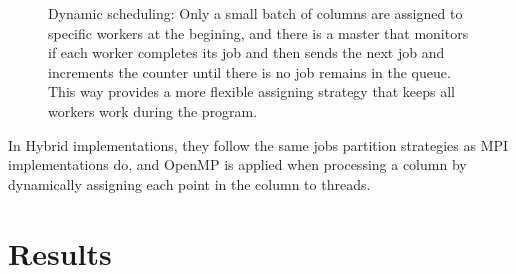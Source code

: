 \documentclass[12pt]{article}
\makeatletter
\renewenvironment{itemize}
{\list{$\bullet$}{\leftmargin\z@ \labelwidth\z@ \itemindent-\leftmargin
\let\makelabel\descriptionlabel}}
{\endlist}
\makeatother
\begin{document}
\begin{itemize}
\begin{figure}
        \hspace{-.5cm}
        \vspace{-.5cm}
        \caption{Dynamic scheduling: Only a small batch of columns are assigned to specific workers at the begining, and there is a master that monitors if each worker completes its job and then sends the next job and increments the counter until there is no job remains in the queue. This way provides a more flexible assigning strategy that keeps all workers work during the program.}
    \end{figure}
\end{itemize}

In Hybrid implementations, they follow the same jobs partition strategies as MPI implementations do, and OpenMP is applied when processing a column by dynamically assigning each point in the column to threads.

\newpage

\vspace{-2cm}
\section*{Results}
\vspace{-20pt}
\noindent\makebox[\linewidth]{\rule{\textwidth}{0.4pt}}
\end{document}

